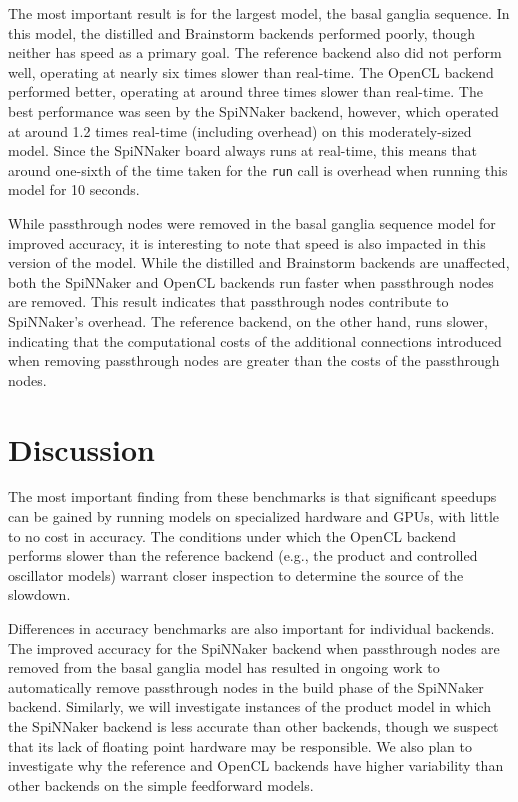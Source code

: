 \documentclass{frontiersSCNS}
\begin{document}
The most important result is for the largest model,
the basal ganglia sequence.
In this model, the distilled and Brainstorm backends
performed poorly,
though neither has speed as a primary goal.
The reference backend also did not perform well,
operating at nearly six times slower than real-time.
The OpenCL backend performed better, operating at around
three times slower than real-time.
The best performance was seen by the SpiNNaker backend,
however, which operated at around 1.2 times real-time
(including overhead) on this moderately-sized model.
Since the SpiNNaker board always runs at real-time,
this means that around one-sixth of the time taken
for the \texttt{run} call is overhead
when running this model for 10 seconds.

While passthrough nodes were removed
in the basal ganglia sequence model
for improved accuracy,
it is interesting to note that speed
is also impacted in this version of the model.
While the distilled and Brainstorm backends
are unaffected,
both the SpiNNaker and OpenCL backends run faster
when passthrough nodes are removed.
This result indicates that passthrough nodes
contribute to SpiNNaker's overhead.
The reference backend, on the other hand,
runs slower,
indicating that the computational costs
of the additional connections introduced
when removing passthrough nodes
are greater than the costs of
the passthrough nodes.

\section{Discussion}

The most important finding from these benchmarks
is that significant speedups can be gained by
running models on specialized hardware and GPUs,
with little to no cost in accuracy.
The conditions under which the OpenCL backend
performs slower than the reference backend
(e.g., the product and controlled oscillator models)
warrant closer inspection to determine the source
of the slowdown.

Differences in accuracy benchmarks
are also important for individual backends.
The improved accuracy
for the SpiNNaker backend
when passthrough nodes are removed
from the basal ganglia model
has resulted in ongoing work to
automatically remove passthrough nodes
in the build phase of the SpiNNaker backend.
Similarly, we will investigate
instances of the product model
in which the SpiNNaker backend
is less accurate than other backends,
though we suspect that its
lack of floating point hardware
may be responsible.
We also plan to investigate
why the reference and OpenCL backends
have higher variability than other backends on
the simple feedforward models.
\end{document}
